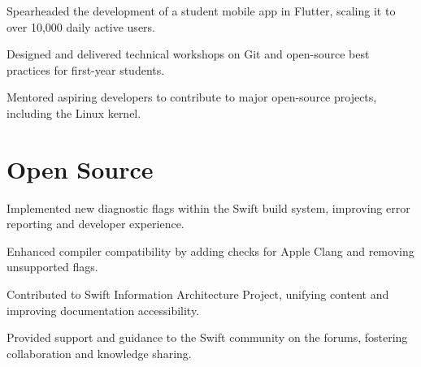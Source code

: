 \documentclass{fonts}
\begin{document}
\textbf{\href{}{}} 
\begin{tightemize}
    \item Spearheaded the development of a student mobile app in Flutter, scaling it to over 10,000 daily active users.
    \item Designed and delivered technical workshops on Git and open-source best practices for first-year students.
    \item Mentored aspiring developers to contribute to major open-source projects, including the Linux kernel.
\end{tightemize}


\section{Open Source}

\textbf{}
\begin{tightemize}
    \item Implemented new diagnostic flags within the Swift build system, improving error reporting and developer experience.
    \item Enhanced compiler compatibility by adding checks for Apple Clang and removing unsupported flags.
    \item Contributed to Swift Information Architecture Project, unifying content and improving documentation accessibility.
    \item Provided support and guidance to the Swift community on the forums, fostering collaboration and knowledge sharing.
\end{tightemize}
\sectionsep


\end{document}
